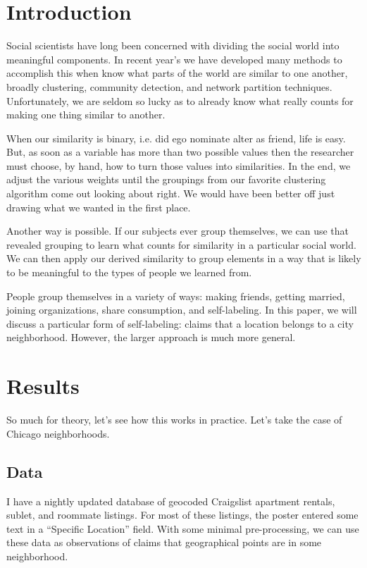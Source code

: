 \documentclass[12pt,letter]{article}\usepackage[]{graphicx}\usepackage[]{color}
\begin{document}
\section*{Introduction}
Social scientists have long been concerned with dividing the social
world into meaningful components. In recent year's we have
developed many methods to accomplish this when know what parts of the
world are similar to one another, broadly clustering, community
detection, and network partition techniques. Unfortunately, we are
seldom so lucky as to already know what really counts for making one
thing similar to another. 

When our similarity is binary, i.e. did ego nominate alter as friend,
life is easy. But, as soon as a variable has more than two possible
values then the researcher must choose, by hand, how to turn those
values into similarities. In the end, we adjust the various weights
until the groupings from our favorite clustering algorithm come out
looking about right. We would have been better off just drawing what
we wanted in the first place.

Another way is possible. If our subjects ever group themselves, we can
use that revealed grouping to learn what counts for similarity in a particular
social world. We can then apply our derived similarity to group elements in
a way that is likely to be meaningful to the types of people we learned from.

People group themselves in a variety of ways: making friends, getting
married, joining organizations, share consumption, and
self-labeling. In this paper, we will discuss a particular form of
self-labeling: claims that a location belongs to a city
neighborhood. However, the larger approach is much more general.



\section*{Results}
So much for theory, let's see how this works in practice. Let's take
the case of Chicago neighborhoods.  

\subsection*{Data}




I have a nightly updated database of geocoded Craigslist apartment
rentals, sublet, and roommate listings. For most of these listings,
the poster entered some text in a ``Specific Location'' field. With
some minimal pre-processing, we can use these data as observations of
claims that geographical points are in some neighborhood.
\end{document}
